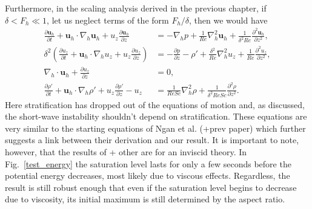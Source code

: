 Furthermore, in the scaling analysis derived in the previous chapter, if $\delta < F_{h} \ll 1$, let us neglect terms of the form $F_{h}/\delta$, then we would have
\begin{align}
\frac{\partial \textbf{u}_{h}}{\partial t} + \textbf{u}_{h}\cdot\nabla_{h}\textbf{u}_{h}+u_{z}\frac{\partial \textbf{u}_{h}}{\partial z} &= -\nabla_{h}p + \frac{1}{Re}\nabla_{h}^{2}\textbf{u}_{h} +  \frac{1}{\delta^{2}Re}\frac{\partial^{2}\textbf{u}_{h}}{\partial z^{2}},\\
\delta^{2}\left(\frac{\partial u_{z}}{\partial t} + \textbf{u}_{h}\cdot\nabla_{h}u_{z}+u_{z}\frac{\partial u_{z}}{\partial z}\right) &= -\frac{\partial p}{\partial z} - \rho' + \frac{\delta^{2}}{Re}\nabla_{h}^{2}u_{z} + \frac{1}{Re}\frac{\partial^{2}u_{z}}{\partial z^{2}},\\
\nabla_{h}\cdot\textbf{u}_{h} + \frac{\partial u_{z}}{\partial z} &=0,\\
\frac{\partial \rho'}{\partial t} + \textbf{u}_{h}\cdot\nabla_{h}\rho' + u_{z}\frac{\partial \rho'}{\partial z}-u_{z}&=\frac{1}{ReSc}\nabla_{h}^{2}\rho + \frac{1}{\delta^{2}ReSc}\frac{\partial^{2}\rho}{\partial z^{2}}.
\end{align}
Here stratification has dropped out of the equations of motion and, as discussed, the short-wave instability shouldn't depend on stratification. These equations are very similar to the starting equations of Ngan et al. \cite{ngan2005} (+prev paper) which further suggests a link between their derivation and our result. It is important to note, however, that the results of \cite{ngan2005} + other are for an inviscid theory. In Fig.~\ref{test_energy} the saturation level lasts for only a few seconds before the potential energy decreases, most likely due to viscous effects. Regardless, the result is still robust enough that even if the saturation level begins to decrease due to viscosity, its initial maximum is still determined by the aspect ratio. 


